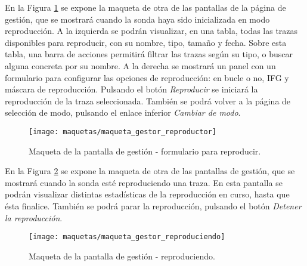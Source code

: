 En la Figura \ref{fig:maqueta:gestor_reproductor} se expone la maqueta de otra de las pantallas de la página de gestión, que se mostrará cuando la sonda haya sido inicializada en modo reproducción.
A la izquierda se podrán visualizar, en una tabla, todas las \glspl{traza} disponibles para reproducir, con su nombre, tipo, tamaño y fecha.
Sobre esta tabla, una barra de acciones permitirá filtrar las \glspl{traza} según su tipo, o buscar alguna concreta por su nombre.
A la derecha se mostrará un panel con un formulario para configurar las opciones de reproducción: en bucle o no, \gls{IFG} y máscara de reproducción.
Pulsando el botón \textit{Reproducir} se iniciará la reproducción de la traza seleccionada.
También se podrá volver a la página de selección de modo, pulsando el enlace inferior \textit{Cambiar de modo}.
\begin{figure}[!htp]
  \centering
  \texttt{[image: maquetas/maqueta\_gestor\_reproductor]}
  \caption{Maqueta de la pantalla de gestión - formulario para reproducir.}
  \label{fig:maqueta:gestor_reproductor}
\end{figure}
\clearpage

En la Figura \ref{fig:maqueta:gestor_reproduciendo} se expone la maqueta de otra de las pantallas de gestión, que se mostrará cuando la sonda esté reproduciendo una \gls{traza}.
En esta pantalla se podrán visualizar distintas estadísticas de la reproducción en curso, hasta que ésta finalice.
También se podrá parar la reproducción, pulsando el botón \textit{Detener la reproducción}.
\begin{figure}[!htp]
  \centering
  \texttt{[image: maquetas/maqueta\_gestor\_reproduciendo]}
  \caption{Maqueta de la pantalla de gestión - reproduciendo.}
  \label{fig:maqueta:gestor_reproduciendo}
\end{figure}